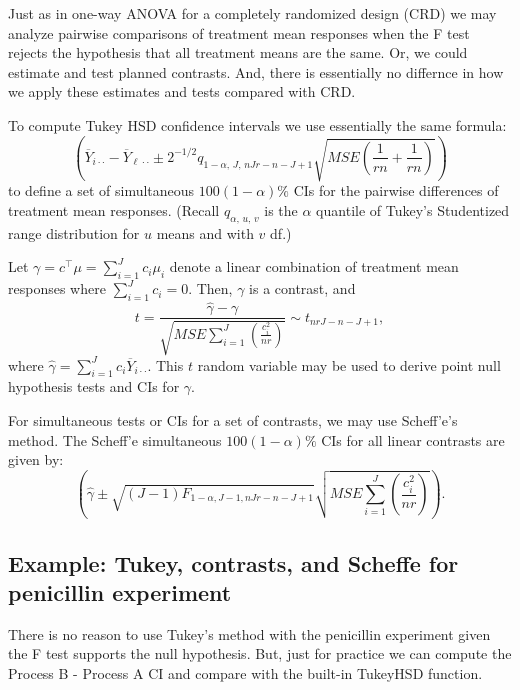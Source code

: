 \documentclass[
]{book}
\begin{document}
Just as in one-way ANOVA for a completely randomized design (CRD) we may analyze pairwise comparisons of treatment mean responses when the F test rejects the hypothesis that all treatment means are the same. Or, we could estimate and test planned contrasts. And, there is essentially no differnce in how we apply these estimates and tests compared with CRD.

To compute Tukey HSD confidence intervals we use essentially the same formula:
\[\left(\overline Y_{i\cdot \cdot} - \overline Y_{\ell \cdot \cdot} \pm 2^{-1/2}q_{1-\alpha, \,J, \,nJr - n- J +1}\sqrt{MSE\left(\frac{1}{rn} + \frac{1}{rn}\right)}\right)\]
to define a set of simultaneous \(100(1-\alpha)\%\) CIs for the pairwise differences of treatment mean responses. (Recall \(q_{\alpha, \,u, \,v}\) is the \(\alpha\) quantile of Tukey's Studentized range distribution for \(u\) means and with \(v\) df.)

Let \(\gamma = c^\top \mu = \sum_{i=1}^J c_i \mu_i\) denote a linear combination of treatment mean responses where \(\sum_{i=1}^J c_i = 0\). Then, \(\gamma\) is a contrast, and
\[t = \frac{\hat\gamma - \gamma}{\sqrt{MSE\sum_{i=1}^J \left(\frac{c_i^2}{nr}\right)}}\sim t_{nrJ - n-J+1},\]
where \(\hat\gamma = \sum_{i=1}^J c_i \overline Y_{i\cdot\cdot}\). This \(t\) random variable may be used to derive point null hypothesis tests and CIs for \(\gamma\).

For simultaneous tests or CIs for a set of contrasts, we may use Scheff'e's method. The Scheff'e simultaneous \(100(1-\alpha)\%\) CIs for all linear contrasts are given by:
\[\left(\hat\gamma \pm \sqrt{(J-1)F_{1-\alpha, J-1, nJr-n-J+1}}\sqrt{MSE\sum_{i=1}^J \left(\frac{c_i^2}{nr}\right)}\right).\]

\hypertarget{example-tukey-contrasts-and-scheffe-for-penicillin-experiment}{%
\subsection{Example: Tukey, contrasts, and Scheffe for penicillin experiment}\label{example-tukey-contrasts-and-scheffe-for-penicillin-experiment}}

There is no reason to use Tukey's method with the penicillin experiment given the F test supports the null hypothesis. But, just for practice we can compute the Process B - Process A CI and compare with the built-in TukeyHSD function.
\end{document}
